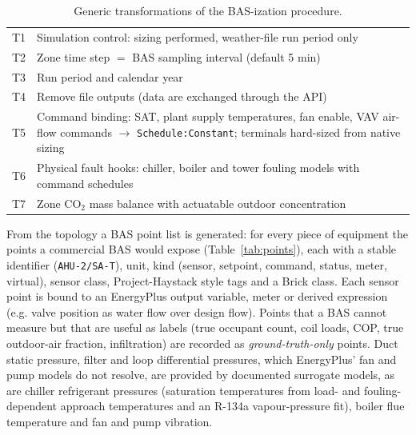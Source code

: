 \documentclass[preprint,12pt,authoryear=false]{elsarticle}
\begin{document}
\begin{table}[!htbp]
\centering\small
\caption{Generic transformations of the BAS-ization procedure.}
\label{tab:transformations}
\begin{tabularx}{\linewidth}{lX}
\toprule
T1 & Simulation control: sizing performed, weather-file run period only \\
T2 & Zone time step $=$ BAS sampling interval (default 5 min) \\
T3 & Run period and calendar year \\
T4 & Remove file outputs (data are exchanged through the API) \\
T5 & Command binding: SAT, plant supply temperatures, fan enable, VAV air-flow commands $\rightarrow$ \texttt{Schedule:Constant}; terminals hard-sized from native sizing \\
T6 & Physical fault hooks: chiller, boiler and tower fouling models with command schedules \\
T7 & Zone CO$_2$ mass balance with actuatable outdoor concentration \\
\bottomrule
\end{tabularx}
\end{table}

From the topology a BAS point list is generated: for every piece of equipment the points a commercial BAS would
expose (Table~\ref{tab:points}), each with a stable identifier (\texttt{AHU-2/SA-T}), unit, kind (sensor, setpoint,
command, status, meter, virtual), sensor class, Project-Haystack style tags and a Brick class. Each sensor point is
bound to an EnergyPlus output variable, meter or derived expression (e.g. valve position as water flow over design
flow). Points that a BAS cannot measure but that are useful as labels (true occupant count, coil loads, COP, true
outdoor-air fraction, infiltration) are recorded as \emph{ground-truth-only} points. Duct static pressure, filter and
loop differential pressures, which EnergyPlus' fan and pump models do not resolve, are provided by documented
surrogate models, as are chiller refrigerant pressures (saturation temperatures from load- and fouling-dependent
approach temperatures and an R-134a vapour-pressure fit), boiler flue temperature and fan and pump vibration.
\end{document}
